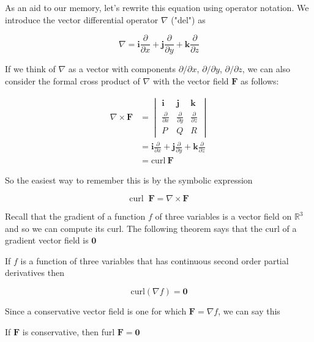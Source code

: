 \documentclass{article}
\begin{document}
As an aid to our memory, let's rewrite this equation using operator notation. We introduce the vector differential operator $\nabla$ ("del") as 

\begin{equation*}
    \nabla = \mathbf{i} \frac{\partial}{\partial x} + \mathbf{j} \frac{\partial}{ \partial y} + \mathbf{k} \frac{\partial}{\partial z}
\end{equation*}

If we think of $\nabla$ as a vector with components $\partial/\partial x$, $\partial/\partial y$, $\partial/\partial z$, we can also consider the formal cross product of $\nabla$ with the vector field $\mathbf{F}$ as follows:

\begin{align*}
    \nabla \times \mathbf{F} & = \begin{vmatrix}
        \mathbf{i} & \mathbf{j} & \mathbf{k} \\[6pt]
        \frac{\partial }{\partial x} & \frac{\partial}{\partial y} & \frac{\partial}{ \partial z} \\[6pt]
        P & Q & R
    \end{vmatrix} \\
    & = \mathbf{i} \frac{\partial}{\partial x} + \mathbf{j} \frac{\partial}{ \partial y} + \mathbf{k} \frac{\partial}{\partial z} \\
    & = \text{curl} \ \mathbf{F}
\end{align*}

So the easiest way to remember this is by the symbolic expression 

\begin{equation*}
    \text{curl } \ \mathbf{F} = \nabla \times \mathbf{F}
\end{equation*}

Recall that the gradient of a function $f$ of three variables is a vector field on $\mathbb{R}^3$ and so we can compute its curl. The following theorem says that the curl of a gradient vector field is $\mathbf{0}$

If $f$ is a function of three variables that has continuous second order partial derivatives then 

\begin{equation*}
    \text{curl}(\nabla f) = \mathbf{0}
\end{equation*}

Since a conservative vector field is one for which $\mathbf{F} = \nabla f$, we can say this

\begin{center}
    If $\mathbf{F}$ is conservative, then furl $\mathbf{F} = \mathbf{0}$
\end{center}
\end{document}

